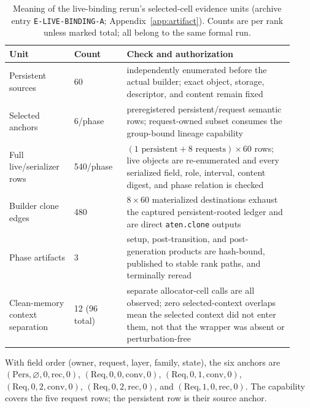 \documentclass{article}
\begin{document}
\begin{table}[H]
  \caption{Meaning of the live-binding rerun's selected-cell evidence units
  (archive entry \texttt{E-LIVE-BINDING-A}; Appendix~\ref{app:artifact}).
  Counts are per rank unless marked total; all belong to the same formal run.}
  \label{tab:v29-evidence-units}
  \centering
  \scriptsize
  \begin{tabular}{@{}p{0.21\linewidth}p{0.17\linewidth}p{0.54\linewidth}@{}}
    \toprule
    Unit & Count & Check and authorization \\
    \midrule
    Persistent sources & 60 & independently enumerated before the actual builder; exact object, storage, descriptor, and content remain fixed \\
    Selected anchors & 6/phase & preregistered persistent/request semantic rows; request-owned subset consumes the group-bound lineage capability \\
    Full live/serializer rows & 540/phase & $(1\text{ persistent}+8\text{ requests})\times60$ rows; live objects are re-enumerated and every serialized field, role, interval, content digest, and phase relation is checked \\
    Builder clone edges & 480 & $8\times60$ materialized destinations exhaust the captured persistent-rooted ledger and are direct \texttt{aten.clone} outputs \\
    Phase artifacts & 3 & setup, post-transition, and post-generation products are hash-bound, published to stable rank paths, and terminally reread \\
    Clean-memory context separation & 12 (96 total) & separate allocator-cell calls are all observed; zero selected-context overlaps mean the selected context did not enter them, not that the wrapper was absent or perturbation-free \\
    \bottomrule
  \end{tabular}
\end{table}

With field order (owner, request, layer, family, state), the six anchors are
$(\mathrm{Pers},\varnothing,0,\mathrm{rec},0)$,
$(\mathrm{Req},0,0,\mathrm{conv},0)$,
$(\mathrm{Req},0,1,\mathrm{conv},0)$,
$(\mathrm{Req},0,2,\mathrm{conv},0)$,
$(\mathrm{Req},0,2,\mathrm{rec},0)$, and
$(\mathrm{Req},1,0,\mathrm{rec},0)$.  The capability covers the five request
rows; the persistent row is their source anchor.
\end{document}
